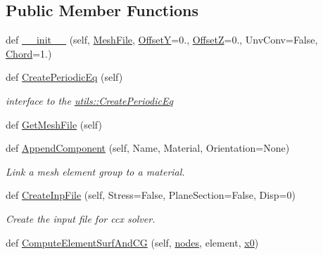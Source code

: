 \subsection*{Public Member Functions}
\begin{DoxyCompactItemize}
\item 
def \hyperlink{classgebtaero_1_1_external_mesh_1_1_external_mesh_ad1301073ba0c00d8ad8fe3dc4baa6068}{\+\_\+\+\_\+init\+\_\+\+\_\+} (self, \hyperlink{classgebtaero_1_1_external_mesh_1_1_external_mesh_a53b38c75b026fb6c56b50b2dd9b5270f}{Mesh\+File}, \hyperlink{classgebtaero_1_1_external_mesh_1_1_external_mesh_a87faefe634a474727d516e58eb8bf944}{OffsetY}=0., \hyperlink{classgebtaero_1_1_external_mesh_1_1_external_mesh_a6639038ee73b225cf0d3ea1bd9c52783}{OffsetZ}=0., Unv\+Conv=False, \hyperlink{classgebtaero_1_1_external_mesh_1_1_external_mesh_ac9f8fc4f8dd8e81757bc8a5b2b5323d4}{Chord}=1.)
\item 
def \hyperlink{classgebtaero_1_1_external_mesh_1_1_external_mesh_aea59f570ee7b3c010c86c61384472834}{Create\+Periodic\+Eq} (self)
\begin{DoxyCompactList}\small\item\em interface to the \hyperlink{namespacegebtaero_1_1utils_a4f786ecbe66af9f64c802adf4e0a990f}{utils\+::\+Create\+Periodic\+Eq} \end{DoxyCompactList}\item 
def \hyperlink{classgebtaero_1_1_external_mesh_1_1_external_mesh_a9ac15ea158d9eeccf982355c551ae334}{Get\+Mesh\+File} (self)
\item 
def \hyperlink{classgebtaero_1_1_external_mesh_1_1_external_mesh_ad1c3ba8013a6829353d55d9513d49359}{Append\+Component} (self, Name, Material, Orientation=None)
\begin{DoxyCompactList}\small\item\em Link a mesh element group to a material. \end{DoxyCompactList}\item 
def \hyperlink{classgebtaero_1_1_external_mesh_1_1_external_mesh_a54e9efc572ecf40516e5c28a48be0bae}{Create\+Inp\+File} (self, Stress=False, Plane\+Section=False, Disp=0)
\begin{DoxyCompactList}\small\item\em Create the input file for ccx solver. \end{DoxyCompactList}\item 
def \hyperlink{classgebtaero_1_1_external_mesh_1_1_external_mesh_ad2151661d358ae9a36e05f98a7d29dc8}{Compute\+Element\+Surf\+And\+CG} (self, \hyperlink{classgebtaero_1_1_external_mesh_1_1_external_mesh_abb7c716a5f2adf2a1f878b1034dcdc57}{nodes}, element, \hyperlink{classgebtaero_1_1_external_mesh_1_1_external_mesh_acaa3b125cb4f80848007b82426c14ffa}{x0})

\end{DoxyCompactItemize}
